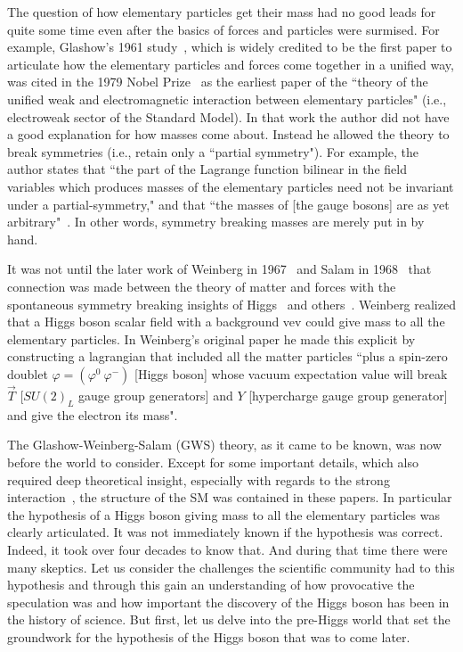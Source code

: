 \documentclass[letter,12pt]{article}
\begin{document}
The question of how elementary particles get their mass had no good leads for quite some time even after the basics of forces and particles were surmised. For example, Glashow's 1961 study~\cite{Glashow:1961tr}, which is widely credited to be the first paper to articulate how the elementary particles and forces come together in a unified way, was cited in the 1979 Nobel Prize~\cite{Nobel:1979}  as the earliest paper of  the ``theory of the unified weak and electromagnetic interaction between elementary particles" (i.e., electroweak sector of the Standard Model). In that work the author did not have a good explanation for how masses come about. Instead he allowed the theory to break symmetries (i.e., retain only a ``partial symmetry").  For example, the author states that ``the part of the Lagrange function bilinear in the field variables which produces masses of the elementary particles need not be invariant under a partial-symmetry," and that ``the masses of [the gauge bosons] are as yet arbitrary"~\cite{Glashow:1961tr}. In other words, symmetry breaking masses are merely put in by hand.

It was not until the later work of Weinberg in 1967~\cite{Weinberg:1967tq} and Salam in 1968~\cite{Salam:1968rm} that connection was made between the theory of matter and forces with the spontaneous symmetry breaking insights of Higgs~\cite{Higgs:1964ia,Higgs:1964pj,Higgs:1966ev} and others~\cite{Englert:1964et,Guralnik:1964eu,Kibble:1967sv}.  Weinberg realized that a Higgs boson scalar field with a background vev could give mass to all the elementary particles.  In Weinberg's original paper he made this explicit by constructing a lagrangian that included all the matter particles ``plus a spin-zero doublet $\varphi=(\varphi^0~\varphi^-)$ [Higgs boson] whose vacuum expectation value will break $\vec T$ [$SU(2)_L$ gauge group generators] and $Y$ [hypercharge gauge group generator] and give the electron its mass"\cite{Weinberg:1967tq}.  

The Glashow-Weinberg-Salam (GWS) theory, as it came to be known, was now before the world to consider. Except for some important details, which also required deep theoretical insight, especially with regards to the strong interaction~\cite{Wilczek:1982yx,Wilczek:2002qt}, the structure of the SM was contained in these papers. In particular the hypothesis of a Higgs boson giving mass to all the elementary particles was clearly articulated. It was not immediately known if the hypothesis was correct. Indeed, it took over four decades to know that. And during that time there were many skeptics. Let us consider the challenges the scientific community had to this hypothesis and through this gain an understanding of how provocative the speculation was and how important the discovery of the Higgs boson has been in the history of science. But first, let us delve into the pre-Higgs world that set the groundwork for the hypothesis of the Higgs boson that was to come later.
\end{document}
